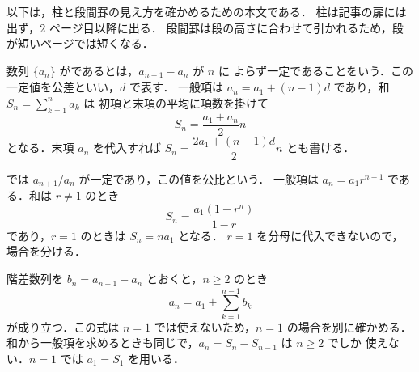 \documentclass[lualatex,paper=b5j,fontsize=10pt,twoside]{jlreq}
\begin{document}

以下は，柱と段間罫の見え方を確かめるための本文である．
柱は記事の扉には出ず，$2$ ページ目以降に出る．
段間罫は段の高さに合わせて引かれるため，段が短いページでは短くなる．

数列 $\{a_n\}$ がであるとは，$a_{n+1}-a_n$ が $n$ に
よらず一定であることをいう．この一定値を公差といい，$d$ で表す．
一般項は $a_n=a_1+(n-1)d$ であり，和 $S_n=\sum_{k=1}^{n}a_k$ は
初項と末項の平均に項数を掛けて
\[
  S_n=\dfrac{a_1+a_n}{2}n
\]
となる．末項 $a_n$ を代入すれば $S_n=\dfrac{2a_1+(n-1)d}{2}n$ とも書ける．

では $a_{n+1}/a_n$ が一定であり，この値を公比という．
一般項は $a_n=a_1r^{n-1}$ である．和は $r\neq1$ のとき
\[
  S_n=\dfrac{a_1(1-r^n)}{1-r}
\]
であり，$r=1$ のときは $S_n=na_1$ となる．
$r=1$ を分母に代入できないので，場合を分ける．

階差数列を $b_n=a_{n+1}-a_n$ とおくと，$n\geq2$ のとき
\[
  a_n=a_1+\sum_{k=1}^{n-1}b_k
\]
が成り立つ．この式は $n=1$ では使えないため，$n=1$ の場合を別に確かめる．
和から一般項を求めるときも同じで，$a_n=S_n-S_{n-1}$ は $n\geq2$ でしか
使えない．$n=1$ では $a_1=S_1$ を用いる．

\end{document}
